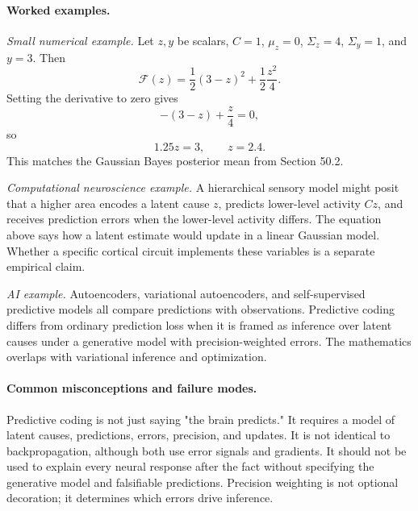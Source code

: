\paragraph{Worked examples.}
\emph{Small numerical example.}
Let \(z,y\) be scalars, \(C=1\), \(\mu_z=0\), \(\Sigma_z=4\), \(\Sigma_y=1\), and \(y=3\). Then
\[
\mathcal F(z)=\frac12(3-z)^2+\frac12\frac{z^2}{4}.
\]
Setting the derivative to zero gives
\[
-(3-z)+\frac{z}{4}=0,
\]
so
\[
1.25z=3,\qquad z=2.4.
\]
This matches the Gaussian Bayes posterior mean from Section 50.2.

\emph{Computational neuroscience example.}
A hierarchical sensory model might posit that a higher area encodes a latent cause \(z\), predicts lower-level activity \(Cz\), and receives prediction errors when the lower-level activity differs. The equation above says how a latent estimate would update in a linear Gaussian model. Whether a specific cortical circuit implements these variables is a separate empirical claim.

\emph{AI example.}
Autoencoders, variational autoencoders, and self-supervised predictive models all compare predictions with observations. Predictive coding differs from ordinary prediction loss when it is framed as inference over latent causes under a generative model with precision-weighted errors. The mathematics overlaps with variational inference and optimization.

\paragraph{Common misconceptions and failure modes.}
Predictive coding is not just saying "the brain predicts." It requires a model of latent causes, predictions, errors, precision, and updates. It is not identical to backpropagation, although both use error signals and gradients. It should not be used to explain every neural response after the fact without specifying the generative model and falsifiable predictions. Precision weighting is not optional decoration; it determines which errors drive inference.

